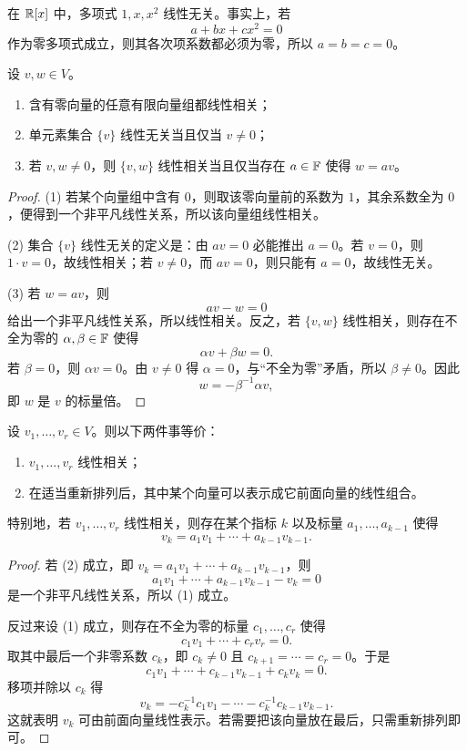 \begin{example}
在 $\mathbb{R}[x]$ 中，多项式 $1,x,x^2$ 线性无关。事实上，若
\[
a+bx+cx^2=0
\]
作为零多项式成立，则其各次项系数都必须为零，所以 $a=b=c=0$。
\end{example}

\begin{proposition}
设 $v,w\in V$。
\begin{enumerate}[label=\textnormal{(\arabic*)}]
  \item 含有零向量的任意有限向量组都线性相关；
  \item 单元素集合 $\{v\}$ 线性无关当且仅当 $v\ne 0$；
  \item 若 $v,w\ne 0$，则 $\{v,w\}$ 线性相关当且仅当存在 $a\in\mathbb{F}$ 使得 $w=av$。
\end{enumerate}
\end{proposition}

\begin{proof}
(1) 若某个向量组中含有 $0$，则取该零向量前的系数为 $1$，其余系数全为 $0$，便得到一个非平凡线性关系，所以该向量组线性相关。

(2) 集合 $\{v\}$ 线性无关的定义是：由 $av=0$ 必能推出 $a=0$。若 $v=0$，则 $1\cdot v=0$，故线性相关；若 $v\ne 0$，而 $av=0$，则只能有 $a=0$，故线性无关。

(3) 若 $w=av$，则
\[
a v-w=0
\]
给出一个非平凡线性关系，所以线性相关。反之，若 $\{v,w\}$ 线性相关，则存在不全为零的 $\alpha,\beta\in\mathbb{F}$ 使得
\[
\alpha v+\beta w=0.
\]
若 $\beta=0$，则 $\alpha v=0$。由 $v\ne 0$ 得 $\alpha=0$，与“不全为零”矛盾，所以 $\beta\ne 0$。因此
\[
w=-\beta^{-1}\alpha v,
\]
即 $w$ 是 $v$ 的标量倍。
\end{proof}

\begin{theorem}[有限向量组的相关判别]
设 $v_1,\dots,v_r\in V$。则以下两件事等价：
\begin{enumerate}[label=\textnormal{(\arabic*)}]
  \item $v_1,\dots,v_r$ 线性相关；
  \item 在适当重新排列后，其中某个向量可以表示成它前面向量的线性组合。
\end{enumerate}
特别地，若 $v_1,\dots,v_r$ 线性相关，则存在某个指标 $k$ 以及标量 $a_1,\dots,a_{k-1}$ 使得
\[
v_k=a_1v_1+\cdots+a_{k-1}v_{k-1}.
\]
\end{theorem}

\begin{proof}
若 (2) 成立，即 $v_k=a_1v_1+\cdots+a_{k-1}v_{k-1}$，则
\[
a_1v_1+\cdots+a_{k-1}v_{k-1}-v_k=0
\]
是一个非平凡线性关系，所以 (1) 成立。

反过来设 (1) 成立，则存在不全为零的标量 $c_1,\dots,c_r$ 使得
\[
c_1v_1+\cdots+c_rv_r=0.
\]
取其中最后一个非零系数 $c_k$，即 $c_k\ne 0$ 且 $c_{k+1}=\cdots=c_r=0$。于是
\[
c_1v_1+\cdots+c_{k-1}v_{k-1}+c_kv_k=0.
\]
移项并除以 $c_k$ 得
\[
v_k=-c_k^{-1}c_1v_1-\cdots-c_k^{-1}c_{k-1}v_{k-1}.
\]
这就表明 $v_k$ 可由前面向量线性表示。若需要把该向量放在最后，只需重新排列即可。
\end{proof}

